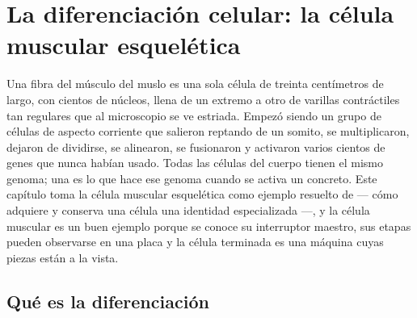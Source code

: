 \chapter{La diferenciación celular: la célula muscular esquelética}\label{ch:b2:cell-differentiation}

Una fibra del músculo del muslo es una sola célula de treinta centímetros
de largo, con cientos de núcleos, llena de un extremo a otro de varillas
contráctiles tan regulares que al microscopio se ve estriada. Empezó
siendo un grupo de células de aspecto corriente que salieron reptando de
un somito, se multiplicaron, dejaron de dividirse, se alinearon, se
fusionaron y activaron varios cientos de genes que nunca habían usado. Todas
las células del cuerpo tienen el mismo genoma; una  es lo
que hace ese genoma cuando se activa un  concreto.
Este capítulo toma la célula muscular esquelética como ejemplo resuelto de
\emph{} --- cómo adquiere y conserva una célula una identidad
especializada ---, y la célula muscular es un buen ejemplo porque se conoce
su interruptor maestro, sus etapas pueden observarse en una placa y la
célula terminada es una máquina cuyas piezas están a la vista.

\section{Qué es la diferenciación}

